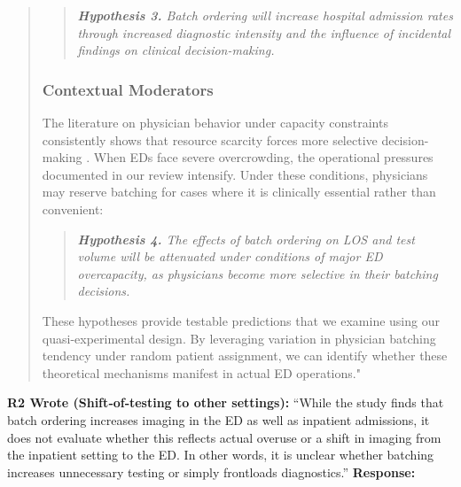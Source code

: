 \documentclass[11pt]{article}
\newenvironment{quote2}
{ \bigskip
\noindent
         \small\em
         \baselineskip=14pt
}
\newcommand{\1}{\hbox{\rm 1\kern-.35em 1}}
\begin{document}
{{\begin{quote}
\begin{quote}
\small
\textit{\textbf{Hypothesis 3.} Batch ordering will increase hospital admission rates through increased diagnostic intensity and the influence of incidental findings on clinical decision-making.}
\end{quote}

\subsubsection*{Contextual Moderators}

The literature on physician behavior under capacity constraints consistently shows that resource scarcity forces more selective decision-making \citep{kuntz2014stress, kc2009impact}. When EDs face severe overcrowding, the operational pressures documented in our review intensify. Under these conditions, physicians may reserve batching for cases where it is clinically essential rather than convenient:

\begin{quote}
\small
\textit{\textbf{Hypothesis 4.} The effects of batch ordering on LOS and test volume will be attenuated under conditions of major ED overcapacity, as physicians become more selective in their batching decisions.}
\end{quote}

These hypotheses provide testable predictions that we examine using our quasi-experimental design. By leveraging variation in physician batching tendency under random patient assignment, we can identify whether these theoretical mechanisms manifest in actual ED operations."
\end{quote}





\color{black}
\begin{quote2}
\textbf{R2 Wrote (Shift‑of‑testing to other settings):}  
“While the study finds that batch ordering increases imaging in the ED as well as inpatient admissions, it does not evaluate whether this
reflects actual overuse or a shift in imaging from the inpatient setting to the ED. In other
words, it is unclear whether batching increases unnecessary testing or simply frontloads
diagnostics.” 
\end{quote2}

\noindent\textbf{Response:} \color{blue}{We thank the reviewer for this important distinction between overuse and frontloading of diagnostics. The reviewer is correct that we cannot definitively determine whether the additional imaging represents unnecessary testing or simply shifts testing from inpatient to ED settings. We have been careful throughout the manuscript to avoid characterizing these additional tests as ``waste" or ``overuse," as our LATE estimate identifies the effect of batching for marginal patients whose testing decisions vary by physician preference—these tests may still have clinical value.

}}}
\end{document}
